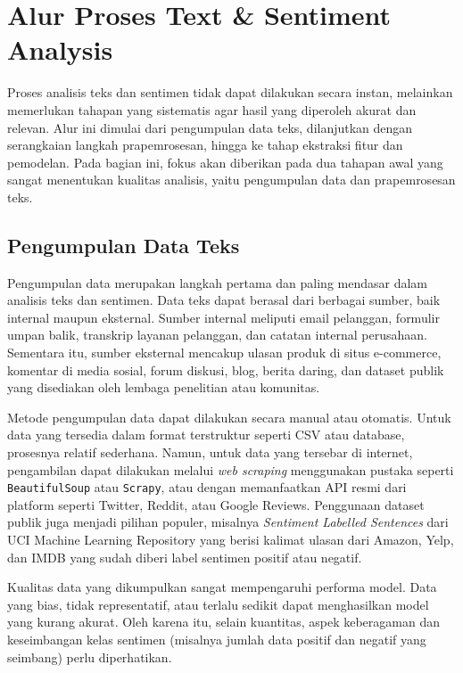 \section{Alur Proses Text \& Sentiment Analysis}

Proses analisis teks dan sentimen tidak dapat dilakukan secara instan, melainkan memerlukan tahapan yang sistematis agar hasil yang diperoleh akurat dan relevan. Alur ini dimulai dari pengumpulan data teks, dilanjutkan dengan serangkaian langkah prapemrosesan, hingga ke tahap ekstraksi fitur dan pemodelan. Pada bagian ini, fokus akan diberikan pada dua tahapan awal yang sangat menentukan kualitas analisis, yaitu pengumpulan data dan prapemrosesan teks.

\subsection{Pengumpulan Data Teks}

Pengumpulan data merupakan langkah pertama dan paling mendasar dalam analisis teks dan sentimen. Data teks dapat berasal dari berbagai sumber, baik internal maupun eksternal. Sumber internal meliputi email pelanggan, formulir umpan balik, transkrip layanan pelanggan, dan catatan internal perusahaan. Sementara itu, sumber eksternal mencakup ulasan produk di situs e-commerce, komentar di media sosial, forum diskusi, blog, berita daring, dan dataset publik yang disediakan oleh lembaga penelitian atau komunitas.

Metode pengumpulan data dapat dilakukan secara manual atau otomatis. Untuk data yang tersedia dalam format terstruktur seperti CSV atau database, prosesnya relatif sederhana. Namun, untuk data yang tersebar di internet, pengambilan dapat dilakukan melalui \textit{web scraping} menggunakan pustaka seperti \texttt{BeautifulSoup} atau \texttt{Scrapy}, atau dengan memanfaatkan API resmi dari platform seperti Twitter, Reddit, atau Google Reviews. Penggunaan dataset publik juga menjadi pilihan populer, misalnya \textit{Sentiment Labelled Sentences} dari UCI Machine Learning Repository yang berisi kalimat ulasan dari Amazon, Yelp, dan IMDB yang sudah diberi label sentimen positif atau negatif.

Kualitas data yang dikumpulkan sangat mempengaruhi performa model. Data yang bias, tidak representatif, atau terlalu sedikit dapat menghasilkan model yang kurang akurat. Oleh karena itu, selain kuantitas, aspek keberagaman dan keseimbangan kelas sentimen (misalnya jumlah data positif dan negatif yang seimbang) perlu diperhatikan.

